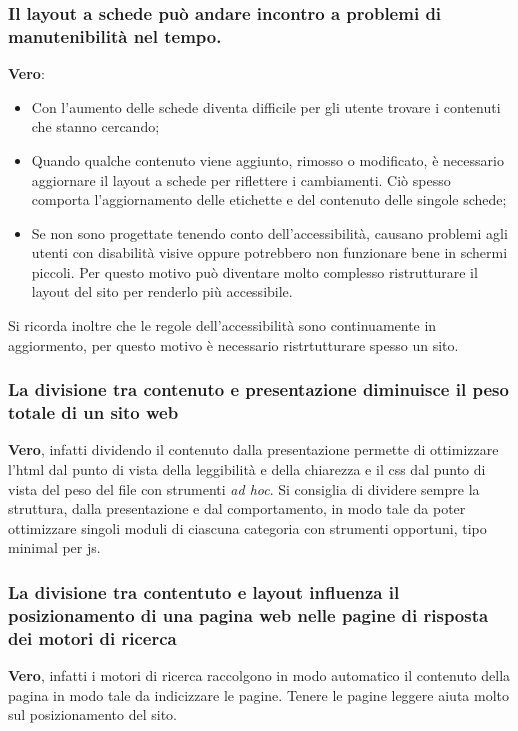 \documentclass[12pt]{article}
\begin{document}
\subsubsection{Il layout a schede può andare incontro a problemi di
	manutenibilità nel tempo.}

\textbf{Vero}:
\begin{itemize}
	\item Con l'aumento delle schede diventa difficile per gli utente trovare i
	      contenuti che stanno cercando;
	\item Quando qualche contenuto viene aggiunto, rimosso o modificato, è
	      necessario aggiornare il layout a schede per riflettere i cambiamenti.
	      Ciò spesso comporta l'aggiornamento delle etichette e del contenuto
	      delle singole schede;
	\item Se non sono progettate tenendo conto dell'accessibilità, causano
	      problemi agli utenti con disabilità visive oppure potrebbero non
	      funzionare bene in schermi piccoli. Per questo motivo può diventare
	      molto complesso ristrutturare il layout del sito per renderlo più
	      accessibile.
\end{itemize}

Si ricorda inoltre che le regole dell'accessibilità sono continuamente in
aggiormento, per questo motivo è necessario ristrtutturare spesso un sito.

\subsubsection{La divisione tra contenuto e presentazione diminuisce il peso
	totale di un sito web}

\textbf{Vero}, infatti dividendo il contenuto dalla presentazione permette di
ottimizzare l'html dal punto di vista della leggibilità e della chiarezza e il
css dal punto di vista del peso del file con strumenti \textit{ad hoc}.
Si consiglia di dividere sempre la struttura, dalla presentazione e dal
comportamento, in modo tale da poter ottimizzare singoli moduli di ciascuna
categoria con strumenti opportuni, tipo minimal per js.

\subsubsection{La divisione tra contentuto e layout influenza il posizionamento
	di una pagina web nelle pagine di risposta dei motori di ricerca}

\textbf{Vero}, infatti i motori di ricerca raccolgono in modo automatico il
contenuto della pagina in modo tale da indicizzare le pagine. Tenere le pagine
leggere aiuta molto sul posizionamento del sito.
\end{document}
